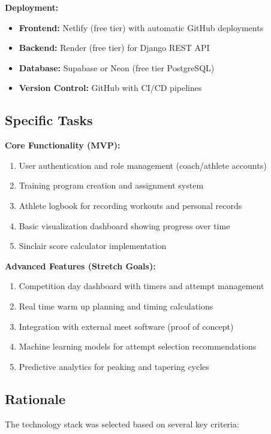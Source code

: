 \documentclass[11pt, oneside]{article}   	%
\begin{document}
\textbf{Deployment:}
\begin{itemize}
    \item \textbf{Frontend:} Netlify (free tier) with automatic GitHub deployments
    \item \textbf{Backend:} Render (free tier) for Django REST API
    \item \textbf{Database:} Supabase or Neon (free tier PostgreSQL)
    \item \textbf{Version Control:} GitHub with CI/CD pipelines
\end{itemize}

\subsection*{Specific Tasks}

\textbf{Core Functionality (MVP):}
\begin{enumerate}
    \item User authentication and role management (coach/athlete accounts)
    \item Training program creation and assignment system
    \item Athlete logbook for recording workouts and personal records
    \item Basic visualization dashboard showing progress over time
    \item Sinclair score calculator implementation
\end{enumerate}

\textbf{Advanced Features (Stretch Goals):}
\begin{enumerate}
    \item Competition day dashboard with timers and attempt management
    \item Real time warm up planning and timing calculations
    \item Integration with external meet software (proof of concept)
    \item Machine learning models for attempt selection recommendations
    \item Predictive analytics for peaking and tapering cycles
\end{enumerate}

\subsection*{Rationale}

The technology stack was selected based on several key criteria:
\end{document}
